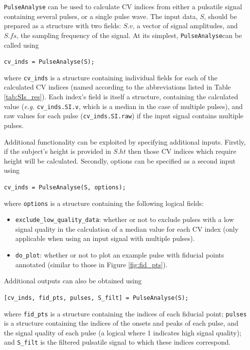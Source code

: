 \documentclass[12pt]{iopart}
\newcommand{\eg}{\textit{e.g.} }
\newcommand{\pa}{\texttt{PulseAnalyse}}
\newcommand{\us}{\texttt{\_}}
\begin{document}
\pa{} can be used to calculate CV indices from either a pulsatile signal containing several pulses, or a single pulse wave. The input data, $S$, should be prepared as a structure with two fields: $S.v$, a vector of signal amplitudes, and $S.fs$, the sampling frequency of the signal. At its simplest, \pa can be called using
\begin{center}
	\texttt{cv\us inds = PulseAnalyse(S);}
\end{center}
where \texttt{cv\us inds} is a structure containing individual fields for each of the calculated CV indices (named according to the abbreviations listed in Table \ref{tab:SIs_res}). Each index's field is itself a structure, containing the calculated value (\eg{} \texttt{cv\us inds.SI.v}, which is a median in the case of multiple pulses), and raw values for each pulse (\texttt{cv\us inds.SI.raw}) if the input signal contains multiple pulses.

Additional functionality can be exploited by specifying additional inputs. Firstly, if the subject's height is provided in $S.ht$ then those CV indices which require height will be calculated. Secondly, options can be specified as a second input using
\begin{center}
	\texttt{cv\us inds = PulseAnalyse(S, options);}
\end{center}
where \texttt{options} is a structure containing the following logical fields:
\begin{itemize}
	\item \texttt{exclude\us low\us quality\us data}: whether or not to exclude pulses with a low signal quality in the calculation of a median value for each CV index (only applicable when using an input signal with multiple pulses).
	\item \texttt{do\us plot}: whether or not to plot an example pulse with fiducial points annotated (similar to those in Figure \ref{fig:fid_pts}).
\end{itemize}

Additional outputs can also be obtained using
\begin{center}
	\texttt{[cv\us inds, fid\us pts, pulses, S\us filt] = PulseAnalyse(S);}
\end{center}
where \texttt{fid\us pts} is a structure containing the indices of each fiducial point; \texttt{pulses} is a structure containing the indices of the onsets and peaks of each pulse, and the signal quality of each pulse (a logical where 1 indicates high signal quality); and \texttt{S\us filt} is the filtered pulsatile signal to which these indices correspond.
\end{document}

